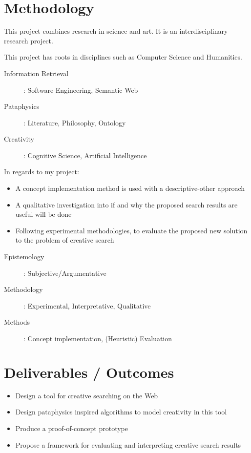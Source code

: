 
\section{Methodology}

This project combines research in science and art. It is an interdisciplinary research project.

This project has roots in disciplines such as Computer Science and Humanities.
\begin{description}
  \item [Information Retrieval]: Software Engineering, Semantic Web
  \item [Pataphysics]: Literature, Philosophy, Ontology
  \item [Creativity]: Cognitive Science, Artificial Intelligence
\end{description}

In regards to my project:
\begin{itemize}
  \item A concept implementation method is used with a descriptive-other approach
  \item A qualitative investigation into if and why the proposed search results are useful will be done
  \item Following experimental methodologies, to evaluate the proposed new solution to the problem of creative search
\end{itemize}

\begin{description}
  \item [Epistemology]: Subjective/Argumentative
  \item [Methodology]: Experimental, Interpretative, Qualitative
  \item [Methods]: Concept implementation, (Heuristic) Evaluation
\end{description}

\section{Deliverables / Outcomes}

\begin{itemize}
  \item Design a tool for creative searching on the Web
  \item Design pataphysics inspired algorithms to model creativity in this tool
  \item Produce a proof-of-concept prototype
  \item Propose a framework for evaluating and interpreting creative search results
\end{itemize}

